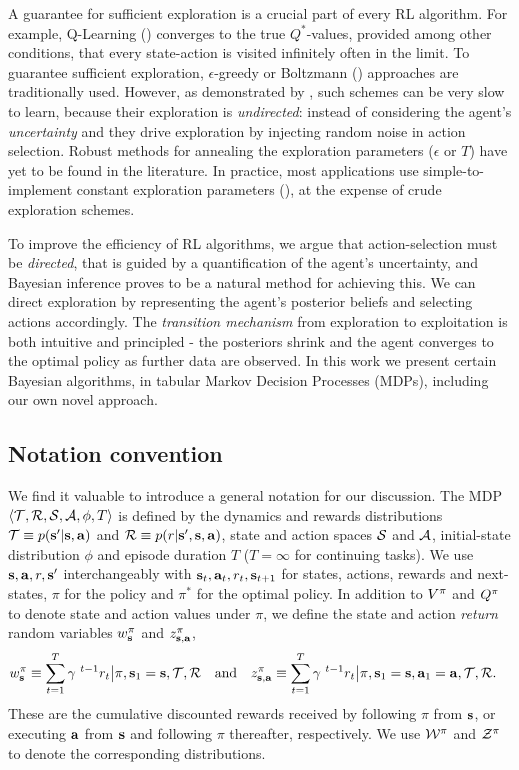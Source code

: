 \documentclass{article}
\begin{document}
A guarantee for sufficient exploration is a crucial part of every RL algorithm. For example, Q-Learning (\cite{qlearning}) converges to the true $Q^*$-values, provided among other conditions, that every state-action is visited infinitely often in the limit. To guarantee sufficient exploration, $\epsilon$-greedy or Boltzmann (\cite{suttonbarto}) approaches are traditionally used. However, as demonstrated by \cite{iothesis}, such schemes can be very slow to learn, because their exploration is \textit{undirected}: instead of considering the agent's \textit{uncertainty} and they drive exploration by injecting random noise in action selection. Robust methods for annealing the exploration parameters ($\epsilon$ or $T$) have yet to be found in the literature. In practice, most applications use simple-to-implement constant exploration parameters (\cite{mnihatari}), at the expense of crude exploration schemes.

To improve the efficiency of RL algorithms, we argue that action-selection must be \textit{directed}, that is guided by a quantification of the agent's uncertainty, and Bayesian inference proves to be a natural method for achieving this. We can direct exploration by representing the agent's posterior beliefs and selecting actions accordingly. The \textit{transition mechanism} from exploration to exploitation is both intuitive and principled - the posteriors shrink and the agent converges to the optimal policy as further data are observed. In this work we present certain Bayesian algorithms, in tabular Markov Decision Processes (MDPs), including our own novel approach.

\subsection{Notation convention}

We find it valuable to introduce a general notation for our discussion. The MDP $\langle \mathcal{T}, \mathcal{R}, \mathcal{S}, \mathcal{A}, \phi, T \rangle$ is defined by the dynamics and rewards distributions $\mathcal{T} \equiv p(\mathbf{s}' | \mathbf{s}, \mathbf{a})$ and $\mathcal{R} \equiv p(r | \mathbf{s}', \mathbf{s}, \mathbf{a})$, state and action spaces $\mathcal{S}$ and $\mathcal{A}$, initial-state distribution $\phi$ and episode duration $T$ ($T = \infty$ for continuing tasks). We use $\mathbf{s}, \mathbf{a}, r, \mathbf{s}'$ interchangeably with $\mathbf{s}_t, \mathbf{a}_t, r_t, \mathbf{s}_{t+1}$ for states, actions, rewards and next-states, $\pi$ for the policy and $\pi^*$ for the optimal policy. In addition to $V^{\pi}$ and $Q^{\pi}$ to denote state and action values under $\pi$, we define the state and action \textit{return} random variables $w^\pi_{\mathbf{s}}$ and $z^\pi_{\mathbf{s}, \mathbf{a}}$,
\begin{align}
w^\pi_{\mathbf{s}} \equiv \sum_{t = 1}^T \gamma^{~t - 1} r_t \big| \pi, \mathbf{s}_1 = \mathbf{s}, \mathcal{T}, \mathcal{R} ~~\text{ and }~~z^\pi_{\mathbf{s}, \mathbf{a}} &\equiv \sum_{t = 1}^T \gamma^{~t - 1} r_t \big| \pi, \mathbf{s}_1 = \mathbf{s}, \mathbf{a}_1 = \mathbf{a}, \mathcal{T}, \mathcal{R}.
\end{align}
These are the cumulative discounted rewards received by following $\pi$ from $\mathbf{s}$, or executing $\mathbf{a}$ from $\mathbf{s}$ and following $\pi$ thereafter, respectively. We use $\mathcal{W}^\pi$ and $\mathcal{Z}^\pi$ to denote the corresponding distributions.
\end{document}
